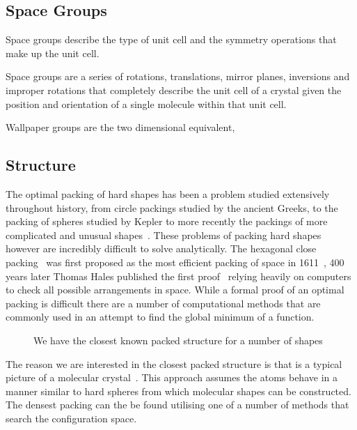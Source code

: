 \subsection{Space Groups}

Space groups describe the type of unit cell and the symmetry operations that make up the unit cell. 


Space groups are a series of rotations, translations, mirror planes, inversions and improper rotations that completely describe the unit cell of a crystal given the position and orientation of a single molecule within that unit cell.

Wallpaper groups are the two dimensional equivalent,

\subsection{Structure}

The optimal packing of hard shapes has been a problem studied extensively throughout history, from circle packings studied by the ancient Greeks, to the packing of spheres studied by Kepler to more recently the packings of more complicated and unusual shapes~\cite{atkinson:12,torquato:12}. These problems of packing hard shapes however are incredibly difficult to solve analytically. The hexagonal close packing~ was first proposed as the most efficient packing of space in 1611~\cite{kepler:1611}, 400 years later Thomas Hales published the first proof~\cite{hales:05,hales:14} relying heavily on computers to check all possible arrangements in space. While a formal proof of an optimal packing is difficult there are a number of computational methods that are commonly used in an attempt to find the global minimum of a function.

\begin{figure}
    \caption{We have the closest known packed structure for a number of shapes}
    \label{fig:hcp}
\end{figure}


The reason we are interested in the closest packed structure is that is a typical picture of a molecular crystal~\cite{kitaigorodskii:73}. This approach assumes the atoms behave in a manner similar to hard spheres from which molecular shapes can be constructed. The densest packing can the be found utilising one of a number of methods that search the configuration space. 


